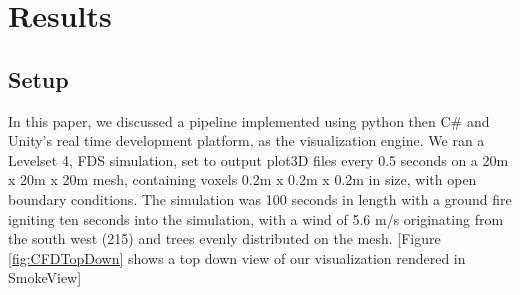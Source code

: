 
\chapter{Results} %

\label{Chapter3} %

\section{Setup}
In this paper, we discussed a pipeline implemented using python then C\# and Unity’s real time development platform, as the visualization engine. We ran a Levelset 4, FDS simulation, set to output plot3D files every 0.5 seconds on a 20m x 20m x 20m mesh, containing voxels 0.2m x 0.2m x 0.2m in size, with open boundary conditions. The simulation was 100 seconds in length with a ground fire igniting ten seconds into the simulation, with a wind of 5.6 m/s originating from the south west (215\textdegree) and trees evenly distributed on the mesh.  [Figure \ref{fig:CFDTopDown} shows a top down view of our visualization rendered in SmokeView] \par
[Github link to fds file?]\par
